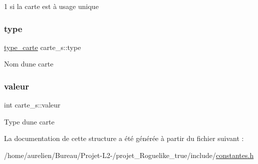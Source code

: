 1 si la carte est à usage unique \mbox{\label{structcarte__s_aaf26c6876557066201a63c65c9ef8e5a}} 
\subsubsection{\texorpdfstring{type}{type}}
{\footnotesize\ttfamily \hyperlink{constantes_8h_a8fb27eb0b354a4f35787ef57ac90e0eb}{type\+\_\+carte} carte\+\_\+s\+::type}

Nom d\textquotesingle{}une carte \mbox{\label{structcarte__s_a432f48dcc3d414a0bdaeb77855060ee1}} 
\subsubsection{\texorpdfstring{valeur}{valeur}}
{\footnotesize\ttfamily int carte\+\_\+s\+::valeur}

Type d\textquotesingle{}une carte 

La documentation de cette structure a été générée à partir du fichier suivant \+:\begin{DoxyCompactItemize}
\item 
/home/aurelien/\+Bureau/\+Projet-\/\+L2-\//projet\+\_\+\+Roguelike\+\_\+true/include/\hyperlink{constantes_8h}{constantes.\+h}\end{DoxyCompactItemize}
